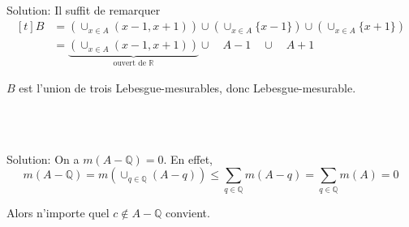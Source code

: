 \documentclass{report}
\begin{document}
\subsection{} \\ \\

Solution: Il suffit de remarquer $$\begin{aligned}[t]
B &= \left(\cup_{x\in A}(x-1,x+1)\right) \cup  \left(\cup_{x\in A}\{x-1\}\right) \cup  \left(\cup_{x\in A}\{x+1\}\right)\\
&= \underbrace{\left(\cup_{x\in A}(x-1,x+1)\right)}_{\text{ouvert de $\mathbb R$}} \cup \quad A-1 \quad \cup \quad A+1 \end{aligned}$$

$B$ est l'union de trois Lebesgue-mesurables, donc Lebesgue-mesurable. \newpage

\subsection{} \\\\

Solution: On a $m(A-\mathbb Q)=0$. En effet, $$m(A-\mathbb Q)=m(\cup_{q\in\mathbb Q}(A-q))\leq \sum_{q\in \mathbb Q}m(A-q) = \sum_{q\in \mathbb Q}m(A)=0 $$

Alors n'importe quel $c\notin A-\mathbb Q$ convient.
\end{document}
